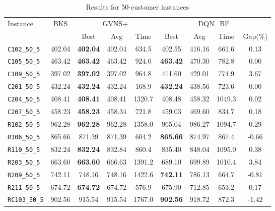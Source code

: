\begin{table}[ht]
\centering
\small
\setlength{\tabcolsep}{5pt}
\caption{Results for 50-customer instances}
\vspace{4mm}
\begin{adjustbox}{width=\textwidth}
\begin{tabular}{l c c c c @{\hspace{8pt}} c c c c @{\hspace{8pt}}}
\toprule
\multirow{2}{*}{Instance} & \multirow{2}{*}{BKS} & \multicolumn{3}{c}{GVNS+} & \multicolumn{4}{c}{DQN\_BF} \\
\cmidrule(lr){3-5} \cmidrule(lr){6-9}
 &  & Best & Avg & Time & Best & Avg & Time & Gap(\%) \\
\midrule
\texttt{C102\_50\_5} & 402.04 & \textbf{402.04} & 402.04 & 634.5 & 402.55 & 416.16 & 661.6 & 0.13 \\
\texttt{C105\_50\_5} & 463.42 & \textbf{463.42} & 463.42 & 924.0 & \textbf{463.42} & 470.30 & 782.8 & 0.00 \\
\texttt{C109\_50\_5} & 397.02 & \textbf{397.02} & 397.02 & 964.8 & 411.60 & 429.01 & 774.9 & 3.67 \\
\texttt{C201\_50\_5} & 432.24 & \textbf{432.24} & 432.24 & 168.9 & \textbf{432.24} & 438.56 & 723.6 & 0.00 \\
\texttt{C204\_50\_5} & 408.41 & \textbf{408.41} & 408.41 & 1320.7 & 408.48 & 458.32 & 1049.3 & 0.02 \\
\texttt{C207\_50\_5} & 458.23 & \textbf{458.23} & 458.34 & 721.8 & 459.03 & 469.60 & 834.7 & 0.18 \\
\texttt{R102\_50\_5} & 962.28 & \textbf{962.28} & 962.28 & 1358.0 & 965.04 & 986.27 & 1094.7 & 0.29 \\
\texttt{R106\_50\_5} & 865.66 & 871.39 & 871.39 & 604.2 & \textbf{865.66} & 874.97 & 867.4 & -0.66 \\
\texttt{R110\_50\_5} & 832.24 & \textbf{832.24} & 832.84 & 860.4 & 835.40 & 848.04 & 1095.0 & 0.38 \\
\texttt{R203\_50\_5} & 663.60 & \textbf{663.60} & 666.63 & 1391.2 & 689.10 & 699.89 & 1010.4 & 3.84 \\
\texttt{R209\_50\_5} & 742.11 & 748.16 & 748.16 & 1422.6 & \textbf{742.11} & 786.13 & 664.7 & -0.81 \\
\texttt{R211\_50\_5} & 674.72 & \textbf{674.72} & 674.72 & 576.9 & 675.90 & 712.85 & 653.2 & 0.17 \\
\texttt{RC103\_50\_5} & 902.56 & 915.54 & 915.54 & 1767.0 & \textbf{902.56} & 918.72 & 872.3 & -1.42 \\

\end{tabular}
\end{adjustbox}
\end{table}
